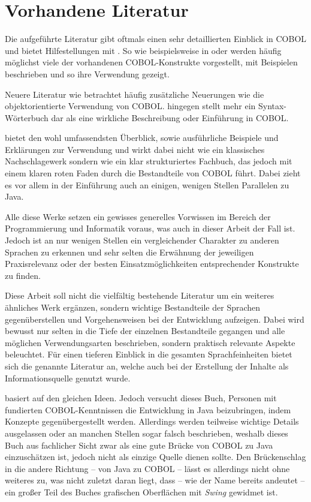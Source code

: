\section{Vorhandene Literatur}
Die aufgeführte Literatur gibt oftmals einen sehr detaillierten Einblick in COBOL und bietet Hilfestellungen mit . So wie beispielsweise in  oder  werden häufig möglichst viele der vorhandenen COBOL-Konstrukte vorgestellt, mit Beispielen beschrieben und so ihre Verwendung gezeigt. 

Neuere Literatur wie  betrachtet häufig zusätzliche Neuerungen wie die objektorientierte Verwendung von COBOL.  
hingegen stellt mehr ein Syntax-Wörterbuch dar als eine wirkliche Beschreibung oder Einführung in COBOL.

 bietet den wohl umfassendsten Überblick, sowie ausführliche Beispiele und Erklärungen zur Verwendung und wirkt dabei nicht wie ein klassisches Nachschlagewerk sondern wie ein klar strukturiertes Fachbuch, das jedoch mit einem klaren roten Faden durch die Bestandteile von COBOL führt. Dabei zieht es vor allem in der Einführung auch an einigen, wenigen Stellen Parallelen zu Java. 

Alle diese Werke setzen ein gewisses generelles Vorwissen im Bereich der Programmierung und Informatik voraus, was auch in dieser Arbeit der Fall ist. Jedoch ist an nur wenigen Stellen ein vergleichender Charakter zu anderen Sprachen zu erkennen und sehr selten die Erwähnung der jeweiligen Praxisrelevanz oder der besten Einsatzmöglichkeiten entsprechender Konstrukte zu finden. 

Diese Arbeit soll nicht die vielfältig bestehende Literatur um ein weiteres ähnliches Werk ergänzen, sondern wichtige Bestandteile der Sprachen gegenüberstellen und Vorgehensweisen bei der Entwicklung aufzeigen. Dabei wird bewusst nur selten in die Tiefe der einzelnen Bestandteile gegangen und alle möglichen Verwendungsarten beschrieben, sondern praktisch relevante Aspekte beleuchtet. Für einen tieferen Einblick in die gesamten Sprachfeinheiten bietet sich die genannte Literatur an, welche auch bei der Erstellung der Inhalte als Informationsquelle genutzt wurde.

 basiert auf den gleichen Ideen. Jedoch versucht dieses Buch, Personen mit fundierten COBOL-Kenntnissen die Entwicklung in Java beizubringen, indem Konzepte gegenübergestellt werden. Allerdings werden teilweise wichtige Details ausgelassen oder an manchen Stellen sogar falsch beschrieben, weshalb dieses Buch aus fachlicher Sicht zwar als eine gute Brücke von COBOL zu Java einzuschätzen ist, jedoch nicht als einzige Quelle dienen sollte. Den Brückenschlag in die andere Richtung -- von Java zu COBOL -- lässt es allerdings nicht ohne weiteres zu, was nicht zuletzt daran liegt, dass -- wie der Name bereits andeutet -- ein großer Teil des Buches grafischen Oberflächen mit \textit{Swing} gewidmet ist.

